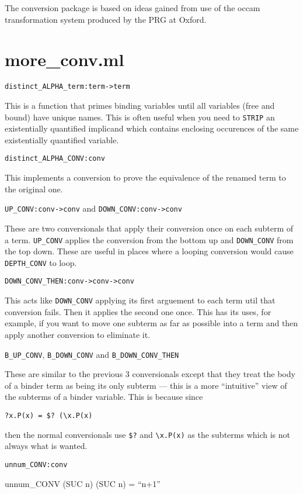 The conversion package is based on ideas gained from use of the occam
transformation system produced by the PRG at Oxford. 

\section*{more\_conv.ml}

\verb!distinct_ALPHA_term:term->term!

This is a function that primes binding variables until all variables (free and bound) have unique names.
This is often useful when you need to \verb!STRIP! an existentially quantified implicand which contains enclosing
occurences of the same existentially quantified variable.

\verb!distinct_ALPHA_CONV:conv!

This implements a conversion to prove the equivalence of the renamed term to the original one.

\verb!UP_CONV:conv->conv! and \verb!DOWN_CONV:conv->conv!

These are two conversionals that apply their conversion once on each subterm of a term. \verb!UP_CONV! applies
the conversion from the bottom up and \verb!DOWN_CONV! from the top down. These are useful in places where
a looping conversion would cause \verb!DEPTH_CONV! to loop.

\verb!DOWN_CONV_THEN:conv->conv->conv!

This acts like \verb!DOWN_CONV! applying its first arguement to each term util that conversion fails. Then
it applies the second one once. This has its uses, for example, if you want to move one subterm as far
as possible into a term and then apply another conversion to eliminate it.

\verb!B_UP_CONV!, \verb!B_DOWN_CONV! and \verb!B_DOWN_CONV_THEN!

These are similar to the previous 3 conversionals except that they treat the body of a binder term as
being its only subterm --- this is a more ``intuitive'' view of the subterms of a binder variable.
This is because since 

\verb!?x.P(x) = $? (\x.P(x)!

then the normal conversionals use \verb!$?! and \verb!\x.P(x)! as the subterms which is not always what is wanted.

\verb!unnum_CONV:conv!

\begin{infrule}
unnum\_CONV (SUC n)
\derive
\vdash (SUC n) = \mbox{\lt ``n+1''}
\end{infrule}

